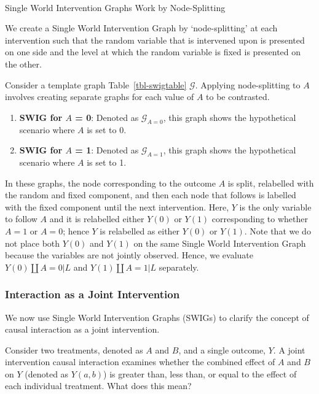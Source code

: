 \documentclass[
  single column]{article}
\makeatletter
\let\oldparagraph\paragraph
\renewcommand{\paragraph}{
    \@ifstar
      \xxxParagraphStar
      \xxxParagraphNoStar
  }
\newcommand{\xxxParagraphStar}[1]{\oldparagraph*{#1}\mbox{}}
\newcommand{\xxxParagraphNoStar}[1]{\oldparagraph{#1}\mbox{}}
\providecommand{\tightlist}{%
  \setlength{\itemsep}{0pt}\setlength{\parskip}{0pt}}\usepackage{longtable,booktabs,array}
\makeatother
\begin{document}
\paragraph{Single World Intervention Graphs Work by
Node-Splitting}\label{single-world-intervention-graphs-work-by-node-splitting}

We create a Single World Intervention Graph by `node-splitting' at each
intervention such that the random variable that is intervened upon is
presented on one side and the level at which the random variable is
fixed is presented on the other.

Consider a template graph Table~\ref{tbl-swigtable} \(\mathcal{G}\).
Applying node-splitting to \(A\) involves creating separate graphs for
each value of \(A\) to be contrasted.

\begin{enumerate}
\def\labelenumi{\arabic{enumi}.}
\tightlist
\item
  \textbf{SWIG for \(A\) = 0}: Denoted as \(\mathcal{G}_{A=0}\), this
  graph shows the hypothetical scenario where \(A\) is set to 0.
\item
  \textbf{SWIG for \(A\) = 1}: Denoted as \(\mathcal{G}_{A=1}\), this
  graph shows the hypothetical scenario where \(A\) is set to 1.
\end{enumerate}

In these graphs, the node corresponding to the outcome \(A\) is split,
relabelled with the random and fixed component, and then each node that
follows is labelled with the fixed component until the next
intervention. Here, \(Y\) is the only variable to follow \(A\) and it is
relabelled either \(Y(0)\) or \(Y(1)\) corresponding to whether \(A=1\)
or \(A=0\); hence \(Y\) is relabelled as either \(Y(0)\) or \(Y(1)\).
Note that we do not place both \(Y(0)\) and \(Y(1)\) on the same Single
World Intervention Graph because the variables are not jointly observed.
Hence, we evaluate \(Y(0)\coprod A = 0| L\) and
\(Y(1)\coprod A = 1 | L\) separately.

\subsubsection{Interaction as a Joint
Intervention}\label{interaction-as-a-joint-intervention}

We now use Single World Intervention Graphs (SWIGs) to clarify the
concept of causal interaction as a joint intervention.

Consider two treatments, denoted as \(A\) and \(B\), and a single
outcome, \(Y\). A joint intervention causal interaction examines whether
the combined effect of \(A\) and \(B\) on \(Y\) (denoted as \(Y(a,b)\))
is greater than, less than, or equal to the effect of each individual
treatment. What does this mean?
\end{document}
